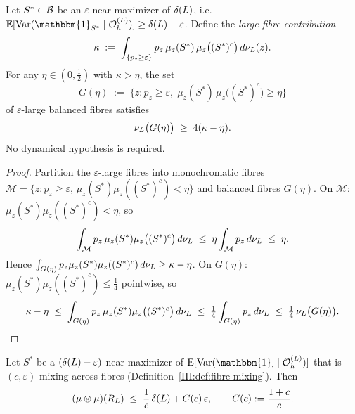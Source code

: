 \begin{lemma}
\label{III:lem:balance}
Let $S^* \in \mathcal{B}$ be an $\varepsilon$-near-maximizer of $\delta(L)$, i.e.\
$\mathbb{E}[\mathrm{Var}(\mathbbm{1}_{S^*} \mid \OhL)] \geq \deltaL - \varepsilon$.
Define the \emph{large-fibre contribution}
\[
  \kappa \;:=\; \int_{\{p_z \geq \varepsilon\}}
    p_z\,\mu_z(S^*)\,\mu_z\bigl((S^*)^c\bigr)\,d\nu_L(z).
\]
For any $\eta \in (0,\tfrac{1}{2})$ with $\kappa > \eta$, the set
\[
  G(\eta) \;:=\; \bigl\{z : p_z \geq \varepsilon,\;
    \mu_z(S^*)\,\mu_z\bigl((S^*)^c\bigr) \geq \eta\bigr\}
\]
of $\varepsilon$-large balanced fibres satisfies
\[
  \nu_L\bigl(G(\eta)\bigr) \;\geq\; 4(\kappa - \eta).
\]
No dynamical hypothesis is required.
\end{lemma}

\begin{proof}
Partition the $\varepsilon$-large fibres into monochromatic fibres
$\mathcal{M} = \{z : p_z \geq \varepsilon,\, \mu_z(S^*)\mu_z((S^*)^c) < \eta\}$
and balanced fibres $G(\eta)$.
On $\mathcal{M}$: $\mu_z(S^*)\mu_z((S^*)^c) < \eta$, so
\[
  \int_{\mathcal{M}} p_z\,\mu_z(S^*)\mu_z\bigl((S^*)^c\bigr)\,d\nu_L
  \;\leq\; \eta\int_{\mathcal{M}} p_z\,d\nu_L \;\leq\; \eta.
\]
Hence $\int_{G(\eta)} p_z\mu_z(S^*)\mu_z((S^*)^c)\,d\nu_L \geq \kappa - \eta$.
On $G(\eta)$: $\mu_z(S^*)\mu_z((S^*)^c) \leq \tfrac{1}{4}$ pointwise, so
\[
  \kappa - \eta
  \;\leq\; \int_{G(\eta)} p_z\,\mu_z(S^*)\mu_z\bigl((S^*)^c\bigr)\,d\nu_L
  \;\leq\; \tfrac{1}{4}\int_{G(\eta)} p_z\,d\nu_L
  \;\leq\; \tfrac{1}{4}\,\nu_L\bigl(G(\eta)\bigr). \qedhere
\]
\end{proof}

\begin{lemma}
\label{III:lem:hard}
Let $S^*$ be a $(\delta(L) - \varepsilon)$-near-maximizer of
$\mathrm{E}[\mathrm{Var}(\mathbbm{1}_{\cdot}\mid\OhL)]$ that is
$(c,\varepsilon)$-mixing across fibres
(Definition~\ref{III:def:fibre-mixing}).
Then
\[
  (\mu\otimes\mu)(R_L) \;\leq\; \frac{1}{c}\,\delta(L) + C(c)\,\varepsilon,
  \qquad C(c) := \frac{1+c}{c}.
\]
\end{lemma}

